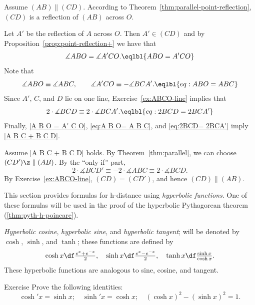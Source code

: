 Assume $(AB)\parallel(C D)$.
According to Theorem~\ref{thm:parallel-point-reflection},
$(CD)$ is a reflection of $(AB)$ across $O$.


Let $A'$ be the reflection of $A$ across $O$.
Then $A'\in (CD)$ and by Proposition~\ref{prop:point-reflection+} we have that
\[\measuredangle ABO=\measuredangle A'CO.\eqlbl{A B O = A' C O}\]
Note that
\[\measuredangle ABO\equiv\measuredangle ABC,
\qquad
\measuredangle A'CO\equiv-\measuredangle BCA'.\eqlbl{eq:A B O= A B C}
\]
Since $A'$, $C$, and $D$ lie on one line, Exercise~\ref{ex:ABCO-line} implies that
\[2\cdot \measuredangle BCD\equiv 2\cdot \measuredangle BCA'.\eqlbl{eq:2BCD= 2BCA'}\]
Finally, \ref{A B O = A' C O}, \ref{eq:A B O= A B C}, and \ref{eq:2BCD= 2BCA'} imply \ref{A B C + B C D}.
\qeds

Assume \ref{A B C + B C D} holds.
By Theorem~\ref{thm:parallel}, we can choose $(CD')\z\parallel(AB)$.
By the ``only-if'' part,
\[
2\cdot\measuredangle BCD'
\equiv-2\cdot\measuredangle ABC
\equiv2\cdot\measuredangle BCD.
\]
By Exercise~\ref{ex:ABCO-line}, $(CD)=(CD')$,
and hence $(CD)\parallel(AB)$.

















This section provides formulas for h-distance using \emph{hyperbolic functions}.
One of these formulas will be used in the proof of the hyperbolic Pythagorean theorem (\ref{thm:pyth-h-poincare}).

\emph{Hyperbolic cosine}, \emph{hyperbolic sine}, and \emph{hyperbolic tangent}\label{hyperbolic tangent};
will be denoted by $\cosh$, $\sinh$, and $\tanh$; these functions are defined by
\[
\cosh x\df \tfrac{e^x+e^{-x}}2,
\quad
\sinh x\df \tfrac{e^x-e^{-x}}2,
\quad
\tanh x\df \tfrac{\sinh x}{\cosh x}.
\]
These hyperbolic functions are analogous to sine, cosine, and tangent.

\begin{thm}{Exercise}\label{ex:hyp-fun}
Prove the following identities:
\[\cosh' x=\sinh x;\quad \sinh'x=\cosh x;\quad (\cosh x)^2-(\sinh x)^2=1.\]
\end{thm}

